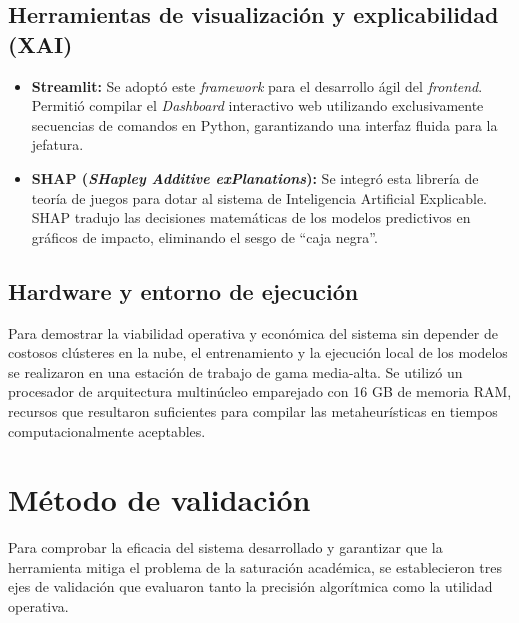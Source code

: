 \subsection{Herramientas de visualización y explicabilidad (XAI)}
\begin{itemize}
    \item \textbf{Streamlit:} Se adoptó este \textit{framework} para el desarrollo ágil del \textit{frontend}. Permitió compilar el \textit{Dashboard} interactivo web utilizando exclusivamente secuencias de comandos en Python, garantizando una interfaz fluida para la jefatura.
    \item \textbf{SHAP (\textit{SHapley Additive exPlanations}):} Se integró esta librería de teoría de juegos para dotar al sistema de Inteligencia Artificial Explicable. SHAP tradujo las decisiones matemáticas de los modelos predictivos en gráficos de impacto, eliminando el sesgo de ``caja negra''.
\end{itemize}

\subsection{Hardware y entorno de ejecución}
Para demostrar la viabilidad operativa y económica del sistema sin depender de costosos clústeres en la nube, el entrenamiento y la ejecución local de los modelos se realizaron en una estación de trabajo de gama media-alta. Se utilizó un procesador de arquitectura multinúcleo emparejado con 16 GB de memoria RAM, recursos que resultaron suficientes para compilar las metaheurísticas en tiempos computacionalmente aceptables.

\section{Método de validación}
Para comprobar la eficacia del sistema desarrollado y garantizar que la herramienta mitiga el problema de la saturación académica, se establecieron tres ejes de validación que evaluaron tanto la precisión algorítmica como la utilidad operativa. 

